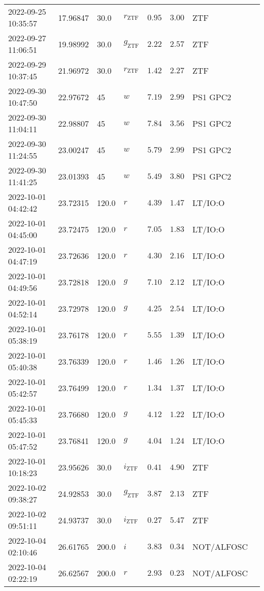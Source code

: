 \documentclass{nature_plusfigure}
\begin{document}
\begin{supplement}
\begin{center}
\begin{longtable}{llllllll}
2022-09-25 10:35:57 & 17.96847 & 30.0 & ${r}_\mathrm{ZTF}$ & $0.95$ & $3.00$ & ZTF &  \\ 
2022-09-27 11:06:51 & 19.98992 & 30.0 & ${g}_\mathrm{ZTF}$ & $2.22$ & $2.57$ & ZTF &  \\ 
2022-09-29 10:37:45 & 21.96972 & 30.0 & ${r}_\mathrm{ZTF}$ & $1.42$ & $2.27$ & ZTF &  \\ 
2022-09-30 10:47:50 & 22.97672 & 45 & $w$ & $7.19$ & $2.99$ & PS1 GPC2 &  \\ 
2022-09-30 11:04:11 & 22.98807 & 45 & $w$ & $7.84$ & $3.56$ & PS1 GPC2 &  \\ 
2022-09-30 11:24:55 & 23.00247 & 45 & $w$ & $5.79$ & $2.99$ & PS1 GPC2 &  \\ 
2022-09-30 11:41:25 & 23.01393 & 45 & $w$ & $5.49$ & $3.80$ & PS1 GPC2 &  \\ 
2022-10-01 04:42:42 & 23.72315 & 120.0 & $r$ & $4.39$ & $1.47$ & LT/IO:O &  \\ 
2022-10-01 04:45:00 & 23.72475 & 120.0 & $r$ & $7.05$ & $1.83$ & LT/IO:O &  \\ 
2022-10-01 04:47:19 & 23.72636 & 120.0 & $r$ & $4.30$ & $2.16$ & LT/IO:O &  \\ 
2022-10-01 04:49:56 & 23.72818 & 120.0 & $g$ & $7.10$ & $2.12$ & LT/IO:O &  \\ 
2022-10-01 04:52:14 & 23.72978 & 120.0 & $g$ & $4.25$ & $2.54$ & LT/IO:O &  \\ 
2022-10-01 05:38:19 & 23.76178 & 120.0 & $r$ & $5.55$ & $1.39$ & LT/IO:O &  \\ 
2022-10-01 05:40:38 & 23.76339 & 120.0 & $r$ & $1.46$ & $1.26$ & LT/IO:O &  \\ 
2022-10-01 05:42:57 & 23.76499 & 120.0 & $r$ & $1.34$ & $1.37$ & LT/IO:O &  \\ 
2022-10-01 05:45:33 & 23.76680 & 120.0 & $g$ & $4.12$ & $1.22$ & LT/IO:O &  \\ 
2022-10-01 05:47:52 & 23.76841 & 120.0 & $g$ & $4.04$ & $1.24$ & LT/IO:O &  \\ 
2022-10-01 10:18:23 & 23.95626 & 30.0 & ${i}_\mathrm{ZTF}$ & $0.41$ & $4.90$ & ZTF &  \\ 
2022-10-02 09:38:27 & 24.92853 & 30.0 & ${g}_\mathrm{ZTF}$ & $3.87$ & $2.13$ & ZTF &  \\ 
2022-10-02 09:51:11 & 24.93737 & 30.0 & ${i}_\mathrm{ZTF}$ & $0.27$ & $5.47$ & ZTF &  \\ 
2022-10-04 02:10:46 & 26.61765 & 200.0 & $i$ & $3.83$ & $0.34$ & NOT/ALFOSC &  \\ 
2022-10-04 02:22:19 & 26.62567 & 200.0 & $r$ & $2.93$ & $0.23$ & NOT/ALFOSC &  \\ 

\end{longtable}
\end{center}
\end{supplement}
\end{document}
